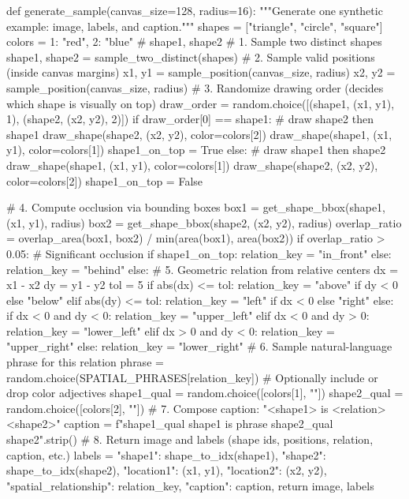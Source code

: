 \documentclass[10pt,twocolumn,letterpaper]{article}
\begin{document}
\begin{RoundedListing}[basicstyle=\fontsize{8}{9}\selectfont\ttfamily\color{atomForeground}]
def generate_sample(canvas_size=128, radius=16):
    """Generate one synthetic example: image, labels, and caption."""
    shapes = ["triangle", "circle", "square"]
    colors = {1: "red", 2: "blue"}  # shape1, shape2
    # 1. Sample two distinct shapes
    shape1, shape2 = sample_two_distinct(shapes)
    # 2. Sample valid positions (inside canvas margins)
    x1, y1 = sample_position(canvas_size, radius)
    x2, y2 = sample_position(canvas_size, radius)
    # 3. Randomize drawing order (decides which shape is visually on top)
    draw_order = random.choice([(shape1, (x1, y1), 1), (shape2, (x2, y2), 2)])
    if draw_order[0] == shape1:
        # draw shape2 then shape1
        draw_shape(shape2, (x2, y2), color=colors[2])
        draw_shape(shape1, (x1, y1), color=colors[1])
        shape1_on_top = True
    else:
        # draw shape1 then shape2
        draw_shape(shape1, (x1, y1), color=colors[1])
        draw_shape(shape2, (x2, y2), color=colors[2])
        shape1_on_top = False

    # 4. Compute occlusion via bounding boxes
    box1 = get_shape_bbox(shape1, (x1, y1), radius)
    box2 = get_shape_bbox(shape2, (x2, y2), radius)
    overlap_ratio = overlap_area(box1, box2) / min(area(box1), area(box2))
    if overlap_ratio > 0.05:
        # Significant occlusion
        if shape1_on_top:
            relation_key = "in_front"
        else:
            relation_key = "behind"
    else:
        # 5. Geometric relation from relative centers
        dx = x1 - x2
        dy = y1 - y2
        tol = 5
        if abs(dx) <= tol:
            relation_key = "above" if dy < 0 else "below"
        elif abs(dy) <= tol:
            relation_key = "left" if dx < 0 else "right"
        else:
            if dx < 0 and dy < 0:
                relation_key = "upper_left"
            elif dx < 0 and dy > 0:
                relation_key = "lower_left"
            elif dx > 0 and dy < 0:
                relation_key = "upper_right"
            else:
                relation_key = "lower_right"
    # 6. Sample natural-language phrase for this relation
    phrase = random.choice(SPATIAL_PHRASES[relation_key])
    # Optionally include or drop color adjectives
    shape1_qual = random.choice([colors[1], ""])
    shape2_qual = random.choice([colors[2], ""])
    # 7. Compose caption: "<shape1> is <relation> <shape2>"
    caption = f"{shape1_qual} {shape1} is {phrase} {shape2_qual} {shape2}".strip()
    # 8. Return image and labels (shape ids, positions, relation, caption, etc.)
    labels = {
        "shape1": shape_to_idx(shape1),
        "shape2": shape_to_idx(shape2),
        "location1": (x1, y1),
        "location2": (x2, y2),
        "spatial_relationship": relation_key,
        "caption": caption,
    }
    return image, labels
\end{RoundedListing}
\end{document}
